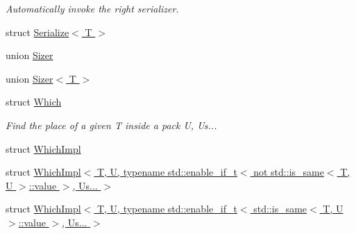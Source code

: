 \begin{DoxyCompactItemize}
\begin{DoxyCompactList}\small\item\em Automatically invoke the right serializer. \end{DoxyCompactList}\item 
struct \hyperlink{structvt_1_1util_1_1adt_1_1detail_1_1_serialize_3_01_t_01_4}{Serialize$<$ T $>$}
\item 
union \hyperlink{unionvt_1_1util_1_1adt_1_1detail_1_1_sizer}{Sizer}
\item 
union \hyperlink{unionvt_1_1util_1_1adt_1_1detail_1_1_sizer_3_01_t_01_4}{Sizer$<$ T $>$}
\item 
struct \hyperlink{structvt_1_1util_1_1adt_1_1detail_1_1_which}{Which}
\begin{DoxyCompactList}\small\item\em Find the place of a given {\ttfamily T} inside a pack {\ttfamily U}, Us... \end{DoxyCompactList}\item 
struct \hyperlink{structvt_1_1util_1_1adt_1_1detail_1_1_which_impl}{Which\+Impl}
\item 
struct \hyperlink{structvt_1_1util_1_1adt_1_1detail_1_1_which_impl_3_01_t_00_01_u_00_01typename_01std_1_1enable__i4d9447de0f2954cce0452213fa3ad5db}{Which\+Impl$<$ T, U, typename std\+::enable\+\_\+if\+\_\+t$<$ not std\+::is\+\_\+same$<$ T, U $>$\+::value $>$, Us... $>$}
\item 
struct \hyperlink{structvt_1_1util_1_1adt_1_1detail_1_1_which_impl_3_01_t_00_01_u_00_01typename_01std_1_1enable__i0f067a3d2e31ed39b40aceedb711df3e}{Which\+Impl$<$ T, U, typename std\+::enable\+\_\+if\+\_\+t$<$ std\+::is\+\_\+same$<$ T, U $>$\+::value $>$, Us... $>$}
\end{DoxyCompactItemize}
